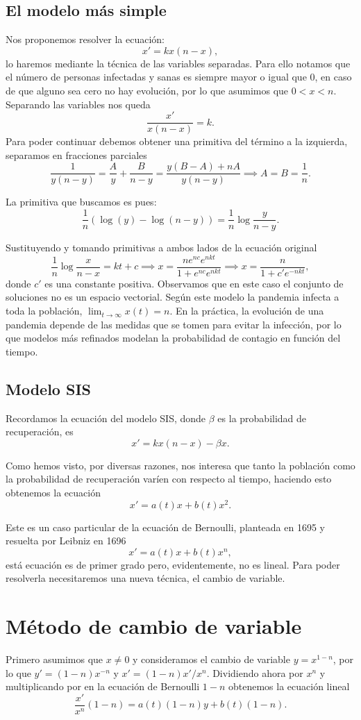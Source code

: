 \documentclass[../main.tex]{subfiles}
\begin{document}
\subsection{El modelo más simple}

Nos proponemos resolver la ecuación:
\[x' = k x(n - x),\]
lo haremos mediante la técnica de las variables separadas. Para ello notamos que
el número de personas infectadas y sanas es siempre mayor o igual que 0, en caso
de que alguno sea cero no hay evolución, por lo que asumimos que \(0 < x < n\).
Separando las variables nos queda
\[\frac{x'}{x(n - x)} = k.\]
Para poder continuar debemos obtener una primitiva del término a la izquierda,
separamos en fracciones parciales
\[\frac{1}{y(n - y)} = \frac{A}{y} + \frac{B}{n - y}
	= \frac{y(B - A) + nA}{y(n - y)} \implies A = B = \frac{1}{n}.\]

La primitiva que buscamos es pues:
\[\frac{1}{n} (\log(y) - \log(n - y)) = \frac{1}{n} \log \frac{y}{n - y}.\]

Sustituyendo y tomando primitivas a ambos lados de la ecuación original
\[\frac{1}{n} \log\frac{x}{n - x} = kt + c
	\implies x = \frac{n e^{nc} e^{nkt}}{1 + e^{nc} e^{nkt}}
	\implies x = \frac{n}{1 + c' e^{-nkt}},\]
donde \(c'\) es una constante positiva. Observamos que en este caso el
conjunto de soluciones no es un espacio vectorial. Según este modelo la
pandemia infecta a toda la población, \(\lim_{t \to \infty} x(t) = n\). En la
práctica, la evolución de una pandemia depende de las medidas que se tomen
para evitar la infección, por lo que modelos más refinados modelan la
probabilidad de contagio en función del tiempo.

\subsection{Modelo SIS}

Recordamos la ecuación del modelo SIS, donde \(\beta\) es la probabilidad de
recuperación, es
\[x' = k x(n - x) - \beta x.\]

Como hemos visto, por diversas razones, nos interesa que tanto la población como
la probabilidad de recuperación varíen con respecto al tiempo, haciendo esto
obtenemos la ecuación
\[x' = a(t)x + b(t)x^2.\]

Este es un caso particular de la ecuación de Bernoulli, planteada en 1695 y
resuelta por Leibniz en 1696
\[x' = a(t)x + b(t)x^n,\]
está ecuación es de primer grado pero, evidentemente, no es lineal. Para poder
resolverla necesitaremos una nueva técnica, el cambio de variable.

\section{Método de cambio de variable}

Primero asumimos que \(x \neq 0\) y consideramos el cambio de variable
\(y = x^{1 - n}\), por lo que \(y' = (1 - n) x^{-n}\) y \(x' = (1 - n)x'/x^n\).
Dividiendo ahora por \(x^n\) y multiplicando por en la ecuación de Bernoulli
\(1 - n\) obtenemos la ecuación lineal
\[\frac{x'}{x^n}(1 - n) = a(t)(1 - n)y + b(t)(1 - n).\]
\end{document}
